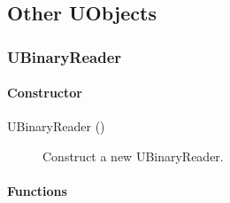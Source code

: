 \subsection{Other UObjects}

\subsubsection{UBinaryReader}

\paragraph{Constructor}

\noindent
\begin{description}
\item[{UBinaryReader ()}] Construct a new UBinaryReader.
\end{description}

\paragraph{Functions}

